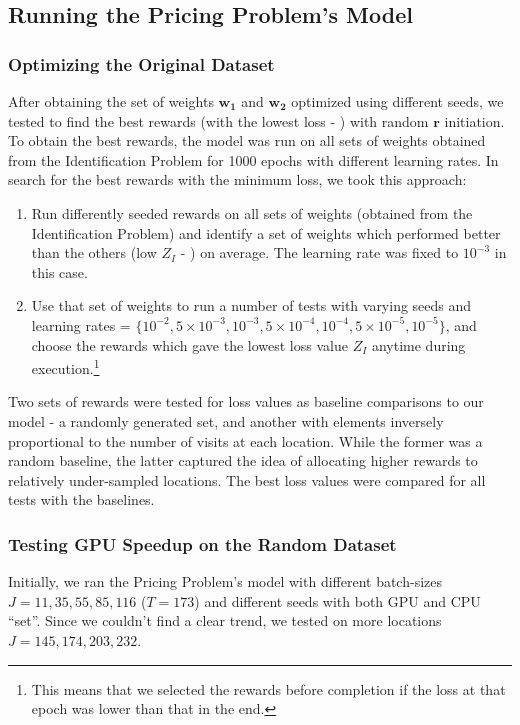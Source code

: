 \documentclass[12pt]{article}
\newcommand{\vect}[1]{\mathbf{#1}}  %
\newcommand{\matr}[1]{\mathbf{#1}}  %
\begin{document}
    \subsection{Running the Pricing Problem's Model} \label{sec:Running the Pricing Problem's Model}
    \subsubsection{Optimizing the Original Dataset} \label{sec:Pricing Problem-Optimizing the Original Dataset}
    After obtaining the set of weights $\matr{w_1}$ and $\matr{w_2}$ optimized using different seeds, we tested to find the best rewards (with the lowest loss - ) with random $\vect{r}$ initiation. To obtain the best rewards, the model was run on all sets of weights obtained from the Identification Problem for 1000 epochs with different learning rates. In search for the best rewards with the minimum loss, we took this approach:
    \begin{enumerate}
        \item Run differently seeded rewards on all sets of weights (obtained from the Identification Problem) and identify a set of weights which performed better than the others (low $Z_I$ - ) on average. The learning rate was fixed to $10^{-3}$ in this case.
        \item Use that set of weights to run a number of tests with varying seeds and learning rates = $\{10^{-2}, 5 \times 10^{-3}, 10^{-3}, 5 \times 10^{-4}, 10^{-4}, 5 \times 10^{-5}, 10^{-5}\}$, and choose the rewards which gave the lowest loss value $Z_I$ anytime during execution.\footnote{This means that we selected the rewards before completion if the loss at that epoch was lower than that in the end.} 
    \end{enumerate}

    Two sets of rewards were tested for loss values as baseline comparisons to our model - a randomly generated set, and another with elements inversely proportional to the number of visits at each location. While the former was a random baseline, the latter captured the idea of allocating higher rewards to relatively under-sampled locations. The best loss values were compared for all tests with the baselines.
    
    \subsubsection{Testing GPU Speedup on the Random Dataset} \label{sec:Pricing Problem-Testing GPU Speedup on the Random Dataset}
    Initially, we ran the Pricing Problem's model with different batch-sizes $J = 11, 35, 55, 85, 116$ ($T = 173$) and different seeds with both GPU and CPU ``set''. Since we couldn't find a clear trend, we tested on more locations $J = 145, 174, 203, 232$.
    
\end{document}
